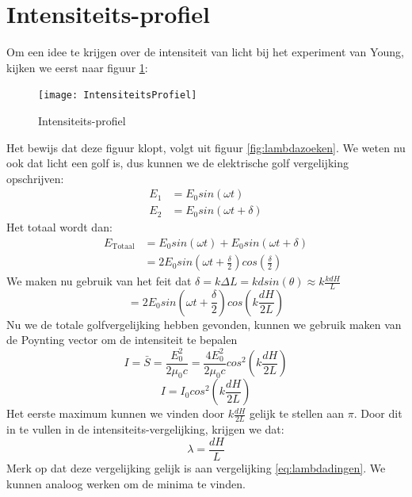 \documentclass[a4paper,kul]{kulakarticle} %
\begin{document}
\section{Intensiteits-profiel}
\label{sec:intensiteitWrong}
Om een idee te krijgen over de intensiteit van licht bij het experiment van Young, kijken we eerst naar figuur \ref{fig:intensiteitsprofiel}:
\begin{figure}[!h]
	\centering
	\texttt{[image: IntensiteitsProfiel]}
	\caption[Intensiteits-profiel]{Intensiteits-profiel}
	\label{fig:intensiteitsprofiel}
\end{figure}
Het bewijs dat deze figuur klopt, volgt uit figuur \ref{fig:lambdazoeken}. We weten nu ook dat licht een golf is, dus kunnen we de elektrische golf vergelijking opschrijven:
\begin{align*}
	E_1&=E_0sin(\omega t)\\
	E_2&=E_0sin(\omega t+\delta)
\end{align*}
Het totaal wordt dan:
\begin{align*}
	E_{\text{Totaal}}&=E_0sin(\omega t)+E_0sin(\omega t+\delta)\\
	&=2E_0sin(\omega t +\frac{\delta}{2})cos(\frac{\delta}{2})
\end{align*}
We maken nu gebruik van het feit dat $\delta = k\Delta L = kdsin(\theta)\approx k\frac{kdH}{L}$
\begin{equation*}
	=2E_0sin(\omega t +\frac{\delta}{2})cos(k\frac{dH}{2L})
\end{equation*}
Nu we de totale golfvergelijking hebben gevonden, kunnen we gebruik maken van de Poynting vector om de intensiteit te bepalen
\begin{equation*}
	I=\bar{S}=\frac{E^2_0}{2\mu_0c}=\frac{4E^2_0}{2\mu_0c}cos^2(k\frac{dH}{2L})
\end{equation*}
\begin{equation*}
	I = I_0cos^2(k\frac{dH}{2L})
\end{equation*}
Het eerste maximum kunnen we vinden door $k\frac{dH}{2L}$ gelijk te stellen aan $\pi$. Door dit in te vullen in de intensiteits-vergelijking, krijgen we dat:
\begin{equation*}
	\lambda=\frac{dH}{L}
\end{equation*}
Merk op dat deze vergelijking gelijk is aan vergelijking \ref{eq:lambdadingen}. We kunnen analoog werken om de minima te vinden.
\newpage
\end{document}
